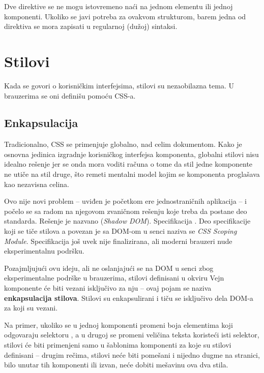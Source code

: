 Dve direktive se ne mogu istovremeno naći na jednom elementu ili jednoj komponenti.
Ukoliko se javi potreba za ovakvom strukturom, barem jedna od direktiva se mora zapisati u regularnoj (dužoj) sintaksi.

\section{Stilovi}
\label{sec:ch04:stilovi}

Kada se govori o korisničkim interfejsima, stilovi su nezaobilazna tema.
U brauzerima se oni definišu pomoću CSS-a.

\subsection{Enkapsulacija}

Tradicionalno, CSS se primenjuje globalno, nad celim dokumentom.
Kako je osnovna jedinica izgradnje korisničkog interfejsa komponenta, globalni stilovi nisu idealno rešenje jer se onda mora voditi računa o tome da stil jedne komponente ne utiče na stil druge, što remeti mentalni model kojim se komponenta proglašava kao nezavisna celina.

Ovo nije novi problem -- uviđen je početkom ere jednostraničnih aplikacija -- i počelo se sa radom na njegovom zvaničnom rešenju koje treba da postane deo standarda.
Rešenje je nazvano  (\textsl{Shadow DOM}).
Specifikacija .
Deo specifikacije koji se tiče stilova a povezan je sa DOM-om u senci naziva se \textsl{CSS Scoping Module}.
Specifikacija još uvek nije finalizirana, ali moderni brauzeri nude eksperimentalnu podršku.

Pozajmljujući ovu ideju, ali ne oslanjajući se na DOM u senci zbog eksperimentalne podrške u brauzerima, stilovi definisani u okviru Vejn komponente će biti vezani isključivo za nju -- ovaj pojam se naziva \textbf{enkapsulacija stilova}.
Stilovi su enkapsulirani i tiču se isključivo dela DOM-a za koji su vezani.

Na primer, ukoliko se u jednoj komponenti promeni boja elementima koji odgovaraju selektoru , a u drugoj se promeni veličina teksta koristeći isti selektor, stilovi će biti primenjeni samo u šablonima komponenti za koje su stilovi definisani -- drugim rečima, stilovi neće biti pomešani i nijedno dugme na stranici, bilo unutar tih komponenti ili izvan, neće dobiti mešavinu ova dva stila.

